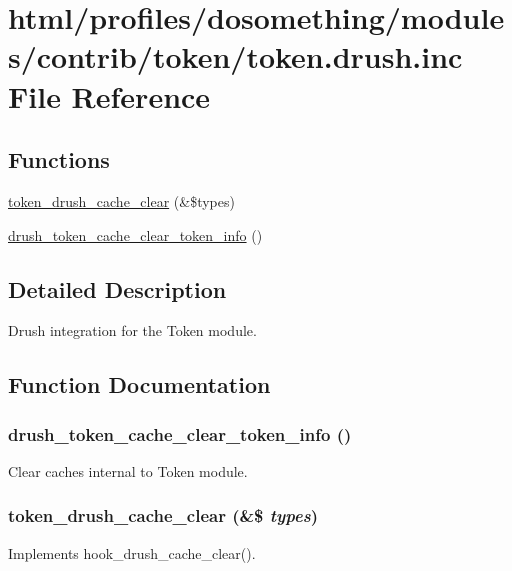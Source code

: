 \hypertarget{token_8drush_8inc}{
\section{html/profiles/dosomething/modules/contrib/token/token.drush.inc File Reference}
\label{token_8drush_8inc}
}
\subsection*{Functions}
\begin{DoxyCompactItemize}
\item 
\hyperlink{token_8drush_8inc_a7b1d993a1ac1719a75c5cf3594358743}{token\_\-drush\_\-cache\_\-clear} (\&\$types)
\item 
\hyperlink{token_8drush_8inc_ae94396c2129344d3d1c40fad3b804f75}{drush\_\-token\_\-cache\_\-clear\_\-token\_\-info} ()
\end{DoxyCompactItemize}


\subsection{Detailed Description}
Drush integration for the Token module. 

\subsection{Function Documentation}
\hypertarget{token_8drush_8inc_ae94396c2129344d3d1c40fad3b804f75}{
\subsubsection[{drush\_\-token\_\-cache\_\-clear\_\-token\_\-info}]{\setlength{\rightskip}{0pt plus 5cm}drush\_\-token\_\-cache\_\-clear\_\-token\_\-info ()}}
\label{token_8drush_8inc_ae94396c2129344d3d1c40fad3b804f75}
Clear caches internal to Token module. \hypertarget{token_8drush_8inc_a7b1d993a1ac1719a75c5cf3594358743}{
\subsubsection[{token\_\-drush\_\-cache\_\-clear}]{\setlength{\rightskip}{0pt plus 5cm}token\_\-drush\_\-cache\_\-clear (\&\$ {\em types})}}
\label{token_8drush_8inc_a7b1d993a1ac1719a75c5cf3594358743}
Implements hook\_\-drush\_\-cache\_\-clear(). 